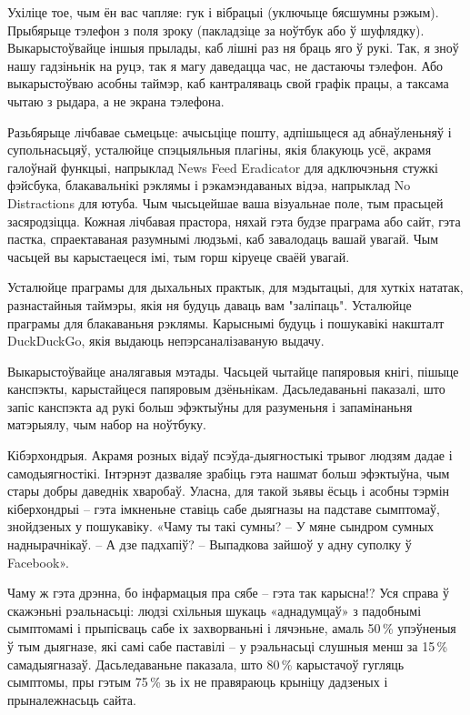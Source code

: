 Ухіліце тое, чым ён вас чапляе: гук і вібрацыі (уключыце бясшумны рэжым). Прыбярыце тэлефон з поля зроку (пакладзіце за ноўтбук або ў шуфлядку). Выкарыстоўвайце іншыя прылады, каб лішні раз ня браць яго ў рукі. Так, я зноў нашу гадзіньнік на руцэ, так я магу даведацца час, не дастаючы тэлефон. Або выкарыстоўваю асобны таймэр, каб кантраляваць свой графік працы, а таксама чытаю з рыдара, а не экрана тэлефона.

Разьбярыце лічбавае сьмецьце: ачысьціце пошту, адпішыцеся ад абнаўленьняў і супольнасьцяў, усталюйце спэцыяльныя плагіны, якія блакуюць усё, акрамя галоўнай функцыі, напрыклад News Feed Eradicator для адключэньня стужкі фэйсбука, блакавальнікі рэклямы і рэкамэндаваных відэа, напрыклад No Distractions для ютуба. Чым чысьцейшае ваша візуальнае поле, тым прасьцей засяродзіцца. Кожная лічбавая прастора, няхай гэта будзе праграма або сайт, гэта пастка, спраектаваная разумнымі людзьмі, каб завалодаць вашай увагай. Чым часьцей вы карыстаецеся імі, тым горш кіруеце сваёй увагай.

Усталюйце праграмы для дыхальных практык, для мэдытацыі, для хуткіх нататак, разнастайныя таймэры, якія ня будуць даваць вам "заліпаць". Усталюйце праграмы для блакаваньня рэклямы. Карыснымі будуць і пошукавікі накшталт DuckDuckGo, якія выдаюць непэрсаналізаваную выдачу.

Выкарыстоўвайце аналягавыя мэтады. Часьцей чытайце папяровыя кнігі, пішыце канспэкты, карыстайцеся папяровым дзёньнікам. Дасьледаваньні паказалі, што запіс канспэкта ад рукі больш эфэктыўны для разуменьня і запамінаньня матэрыялу, чым набор на ноўтбуку.

Кібэрхондрыя. Акрамя розных відаў псэўда-дыягностыкі трывог людзям дадае і самодыягностікі. Інтэрнэт дазваляе зрабіць гэта нашмат больш эфэктыўна, чым стары добры даведнік хваробаў. Уласна, для такой зьявы ёсьць і асобны тэрмін кіберхондрыі – гэта імкненьне ставіць сабе дыягназы на падставе сымптомаў, знойдзеных у пошукавіку. «Чаму ты такі сумны? – У мяне сындром сумных наднырачнікаў. – А дзе падхапіў? -- Выпадкова зайшоў у адну суполку ў Facebook». 

Чаму ж гэта дрэнна, бо інфармацыя пра сябе – гэта так карысна!? Уся справа ў скажэньні рэальнасьці: людзі схільныя шукаць «аднадумцаў» з падобнымі сымптомамі і прыпісваць сабе іх захворваньні і лячэньне, амаль 50\,\% упэўненыя ў тым дыягназе, які самі сабе паставілі – у рэальнасьці слушныя менш за 15\,\% самадыягназаў. Дасьледаваньне паказала, што 80\,\% карыстачоў гугляць сымптомы, пры гэтым 75\,\% зь іх не правяраюць крыніцу дадзеных і прыналежнасьць сайта.

